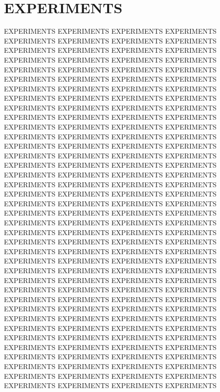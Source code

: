 \section{EXPERIMENTS}

EXPERIMENTS EXPERIMENTS EXPERIMENTS EXPERIMENTS EXPERIMENTS EXPERIMENTS EXPERIMENTS EXPERIMENTS
EXPERIMENTS EXPERIMENTS EXPERIMENTS EXPERIMENTS EXPERIMENTS EXPERIMENTS EXPERIMENTS EXPERIMENTS
EXPERIMENTS EXPERIMENTS EXPERIMENTS EXPERIMENTS EXPERIMENTS EXPERIMENTS EXPERIMENTS EXPERIMENTS
EXPERIMENTS EXPERIMENTS EXPERIMENTS EXPERIMENTS EXPERIMENTS EXPERIMENTS EXPERIMENTS EXPERIMENTS
EXPERIMENTS EXPERIMENTS EXPERIMENTS EXPERIMENTS EXPERIMENTS EXPERIMENTS EXPERIMENTS EXPERIMENTS
EXPERIMENTS EXPERIMENTS EXPERIMENTS EXPERIMENTS EXPERIMENTS EXPERIMENTS EXPERIMENTS EXPERIMENTS
EXPERIMENTS EXPERIMENTS EXPERIMENTS EXPERIMENTS EXPERIMENTS EXPERIMENTS EXPERIMENTS EXPERIMENTS
EXPERIMENTS EXPERIMENTS EXPERIMENTS EXPERIMENTS EXPERIMENTS EXPERIMENTS EXPERIMENTS EXPERIMENTS
EXPERIMENTS EXPERIMENTS EXPERIMENTS EXPERIMENTS EXPERIMENTS EXPERIMENTS EXPERIMENTS EXPERIMENTS
EXPERIMENTS EXPERIMENTS EXPERIMENTS EXPERIMENTS EXPERIMENTS EXPERIMENTS EXPERIMENTS EXPERIMENTS
EXPERIMENTS EXPERIMENTS EXPERIMENTS EXPERIMENTS EXPERIMENTS EXPERIMENTS EXPERIMENTS EXPERIMENTS
EXPERIMENTS EXPERIMENTS EXPERIMENTS EXPERIMENTS EXPERIMENTS EXPERIMENTS EXPERIMENTS EXPERIMENTS
EXPERIMENTS EXPERIMENTS EXPERIMENTS EXPERIMENTS EXPERIMENTS EXPERIMENTS EXPERIMENTS EXPERIMENTS
EXPERIMENTS EXPERIMENTS EXPERIMENTS EXPERIMENTS EXPERIMENTS EXPERIMENTS EXPERIMENTS EXPERIMENTS
EXPERIMENTS EXPERIMENTS EXPERIMENTS EXPERIMENTS EXPERIMENTS EXPERIMENTS EXPERIMENTS EXPERIMENTS
EXPERIMENTS EXPERIMENTS EXPERIMENTS EXPERIMENTS EXPERIMENTS EXPERIMENTS EXPERIMENTS EXPERIMENTS
EXPERIMENTS EXPERIMENTS EXPERIMENTS EXPERIMENTS EXPERIMENTS EXPERIMENTS EXPERIMENTS EXPERIMENTS
EXPERIMENTS EXPERIMENTS EXPERIMENTS EXPERIMENTS EXPERIMENTS EXPERIMENTS EXPERIMENTS EXPERIMENTS
EXPERIMENTS EXPERIMENTS EXPERIMENTS EXPERIMENTS EXPERIMENTS EXPERIMENTS EXPERIMENTS EXPERIMENTS
